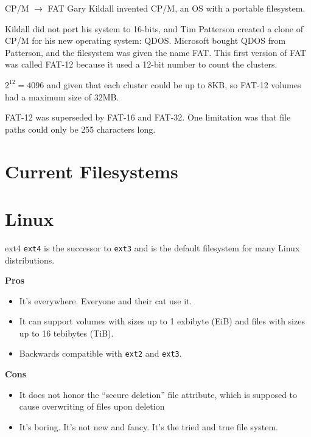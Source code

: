 \documentclass{lug}
\begin{document}
\begin{frame}{CP/M $\rightarrow$ FAT}
    Gary Kildall invented CP/M, an OS with a portable filesystem.

    Kildall did not port his system to 16-bits, and Tim Patterson created a
    clone of CP/M for his new operating system: QDOS. Microsoft bought QDOS from
    Patterson, and the filesystem was given the name FAT. This first version of
    FAT was called FAT-12 because it used a 12-bit number to count the clusters.

    $2^{12} = 4096$ and given that each cluster could be up to 8KB, so FAT-12
    volumes had a maximum size of 32MB.

    FAT-12 was superseded by FAT-16 and FAT-32. One limitation was that file
    paths could only be 255 characters long.
\end{frame}

\section{Current Filesystems}

\section{Linux}
\begin{frame}{ext4}
    \texttt{ext4} is the successor to \texttt{ext3} and is the default
    filesystem for many Linux distributions.

    \textbf{Pros}
    \begin{itemize}
        \item It's everywhere. Everyone and their cat use it.
        \item It can support volumes with sizes up to 1 exbibyte (EiB) and files
            with sizes up to 16 tebibytes (TiB).
        \item Backwards compatible with \texttt{ext2} and \texttt{ext3}.
    \end{itemize}

    \textbf{Cons}
    \begin{itemize}
        \item It does not honor the ``secure deletion'' file attribute, which is
            supposed to cause overwriting of files upon deletion
        \item It's boring. It's not new and fancy. It's the tried and true file
            system.
    \end{itemize}
\end{frame}
\end{document}
